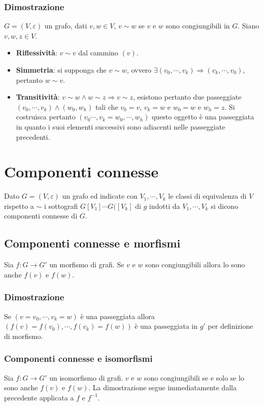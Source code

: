 \subsubsection{Dimostrazione}
$G=(V,\varepsilon)$ un grafo, dati $v, w\in V$, $v\sim w$ se $v$ e $w$ sono congiungibili in $G$. Siano $v,w,z\in V$.
\begin{itemize}
\item \textbf{Riflessivit\`a}: $v\sim v$ dal cammino $(v)$.
\item \textbf{Simmetria}: si supponga che $v\sim w$, ovvero $\exists (v_0, \cdots, v_k)\Rightarrow(v_k, \cdots, v_0)$, pertanto $w\sim v$.
\item \textbf{Transitivit\`a}: $v\sim w\wedge w\sim z\Rightarrow v\sim z$, esistono pertanto due passeggiate $(v_0,\cdots, v_k)\wedge (w_0, w_h)$ tali che $v_0=v$, $v_k=w$ e 
$w_0=w$ e $w_h=z$. Si costruisca pertanto $(v_0\cdots, v_k=w_0, \cdots, w_h)$ questo oggetto \`e una passeggiata in quanto i suoi elementi successivi sono adiacenti nelle 
passeggiate precedenti.
\end{itemize}
\section{Componenti connesse}
Dato $G=(V, \varepsilon)$ un grafo ed indicate con $V_1, \cdots, V_k$ le classi di equivalenza di $V$ rispetto a $\sim$ i sottografi $G[V_1]\cdots G([V_k]$ di $g$ indotti da 
$V_1, \cdots, V_k$ si dicono componenti connesse di $G$.
\subsection{Componenti connesse e morfismi}
Sia $f:G\rightarrow G'$ un morfismo di grafi. Se $v$ e $w$ sono congiungibili allora lo sono anche $f(v)$ e $f(w)$.
\subsubsection{Dimostrazione}
Se $(v=v_0,\cdots, v_k=w)$ \`e una passeggiata allora $(f(v)=f(v_0),\cdots, f(v_k)=f(w))$ \`e una passeggiata in $g'$ per definizione di morfismo.
\subsubsection{Componenti connesse e isomorfismi}
Sia $f:G\rightarrow G'$ un isomorfismo di grafi. $v$ e $w$ sono congiungibili se e solo se lo sono anche $f(v)$ e $f(w)$. La dimostrazione segue immediatamente dalla precedente
applicata  a $f$ e $f^{-1}$.
